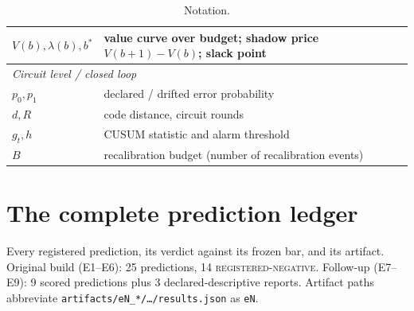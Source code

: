\documentclass[11pt]{article}
\newcommand{\grade}[1]{\textsc{#1}}
\newcommand{\gRegNeg}{\grade{registered-negative}}
\theoremstyle{definition}
\begin{document}
\begin{table}[htbp]
\begin{tabular}{l p{10.5cm}}
$V(b), \lambda(b), b^{*}$ & value curve over budget; shadow price $V(b{+}1)-V(b)$; slack point \\
\midrule
\multicolumn{2}{l}{\emph{Circuit level / closed loop}} \\
$p_0, p_1$ & declared / drifted error probability \\
$d, R$ & code distance, circuit rounds \\
$g_t, h$ & CUSUM statistic and alarm threshold \\
$B$ & recalibration budget (number of recalibration events) \\
\bottomrule
\end{tabular}
\caption{Notation.}
\label{tab:notation}
\end{table}

 \section{The complete prediction ledger}
\label{app:predictions}

Every registered prediction, its verdict against its frozen bar, and its artifact. Original build (E1--E6): 25 predictions, 14 \gRegNeg. Follow-up (E7--E9): 9 scored predictions plus 3 declared-descriptive reports. Artifact paths abbreviate \texttt{artifacts/eN\_*/\dots/results.json} as \texttt{eN}.
\end{document}
